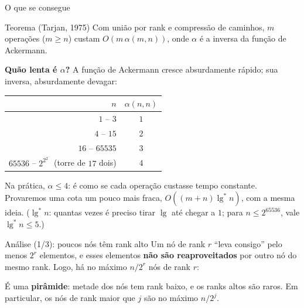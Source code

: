\documentclass[aspectratio=169,10pt]{beamer}
\renewcommand{\lg}{\operatorname{lg}}
\newcommand{\lgs}{\lg^{*}}
\begin{document}
\begin{frame}[t]{O que se consegue}
  \small
  \begin{block}{Teorema (Tarjan, 1975)}
    Com união por rank e compressão de caminhos, $m$ operações
    ($m\geq n$) custam $O(m\,\alpha(m,n))$, onde $\alpha$ é a inversa da
    função de Ackermann.
  \end{block}

  \medskip
  \textbf{Quão lenta é $\alpha$?}  A função de Ackermann cresce
  absurdamente rápido; sua inversa, absurdamente devagar:

  \medskip
  \centering
  \begin{tabular}{|r|c|}\hline
    $n$ & $\alpha(n,n)$ \\ \hline\hline
    $1$ -- $3$ & $1$ \\ \hline
    $4$ -- $15$ & $2$ \\ \hline
    $16$ -- $65535$ & $3$ \\ \hline
    $65536$ -- $2^{2^{2^{\cdots}}}$ (torre de $17$ dois) & $4$ \\ \hline
  \end{tabular}

  \medskip
  \raggedright
  Na prática, \textbf{$\alpha\leq4$}: é como se cada operação custasse
  tempo constante.  Provaremos uma cota um pouco mais fraca,
  $O((m+n)\lgs n)$, com a mesma ideia.  ($\lgs n$: quantas vezes é
  preciso tirar $\lg$ até chegar a $1$; para $n\leq2^{65536}$, vale
  $\lgs n\leq5$.)
\end{frame}

\begin{frame}[c]{Análise (1/3): poucos nós têm rank alto}
  \small
  Um nó de rank $r$ ``leva consigo'' pelo menos $2^r$ elementos, e esses
  elementos \textbf{não são reaproveitados} por outro nó do mesmo rank.
  Logo, há no máximo $n/2^r$ nós de rank $r$:

  \medskip
  \centering

  \medskip
  \raggedright
  É uma \textbf{pirâmide}: metade dos nós tem rank baixo, e os ranks altos
  são raros.  Em particular, os nós de rank maior que $j$ são no máximo
  $n/2^j$.
\end{frame}
\end{document}
